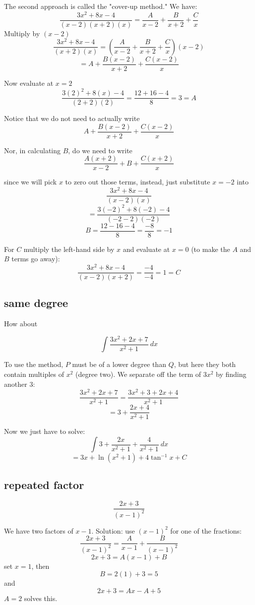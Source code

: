\documentclass[11pt, oneside]{article}
\begin{document}
The second approach is called the "cover-up method."  We have:
\[ \frac{3x^2 + 8x -4}{(x-2)(x+2)(x)} = \frac{A}{x-2} + \frac{B}{x+2} + \frac{C}{x} \]
Multiply by $(x-2)$
\[ \frac{3x^2 + 8x - 4}{(x+2)(x)} = (\frac{A}{x-2} + \frac{B}{x+2} + \frac{C}{x}) (x-2) \]
\[ = A +  \frac{B(x-2)}{x+2} + \frac{C(x-2)}{x} \]

Now evaluate at $x=2$
\[ \frac{3(2)^2 + 8(x) - 4}{(2+2)(2)} = \frac{12 + 16 - 4}{8} = 3 = A \]

Notice that we do not need to actually write 
\[ A +  \frac{B(x-2)}{x+2} + \frac{C(x-2)}{x} \]

Nor, in calculating $B$, do we need to write
\[ \frac{A(x+2)}{x-2} + B + \frac{C(x+2)}{x} \]

since we will pick $x$ to zero out those terms, instead, just substitute $x=-2$ into
\[ \frac{3x^2 + 8x - 4}{(x-2)(x)} \]
\[ = \frac{3(-2)^2 + 8(-2) - 4}{(-2-2)(-2)} \]
\[ B = \frac{12 - 16 -4}{8} = \frac{-8}{8} = -1 \]

For $C$ multiply the left-hand side by $x$ and evaluate at $x = 0$ (to make the $A$ and $B$ terms go away):
\[ \frac{3x^2 + 8x -4}{(x-2)(x+2)} = \frac{-4}{-4} = 1 = C \]

\subsection*{same degree}

How about 

\[ \int \frac{3x^2 + 2x + 7}{x^2 + 1} \ dx \]

To use the method, $P$ must be of a lower degree than $Q$, but here they both contain multiples of $x^2$ (degree two).  We separate off the term of $3x^2$ by finding another $3$:
\[ \frac{3x^2 + 2x + 7}{x^2 + 1} = \frac{3x^2 + 3 + 2x + 4}{x^2 + 1} \]
\[ = 3 + \frac{2x + 4}{x^2 + 1} \]

Now we just have to solve:
\[ \int 3 + \frac{2x}{x^2 + 1} + \frac{4}{x^2 + 1} \ dx \]
\[ = 3x + \ln(x^2 + 1) + 4 \tan^{-1} x + C \]

\subsection*{repeated factor}
\[ \frac{2x+3}{(x-1)^2} \]

We have two factors of $x-1$.  Solution:  use $(x-1)^2$ for one of the fractions:
\[ \frac{2x+3}{(x-1)^2} = \frac{A}{x-1} + \frac{B}{(x-1)^2} \]
\[ 2x + 3 = A(x-1) + B \]
set $x=1$, then 
\[ B = 2(1) + 3 = 5 \]
and
\[ 2x + 3 = Ax - A + 5 \]
$A=2$ solves this.
\end{document}
